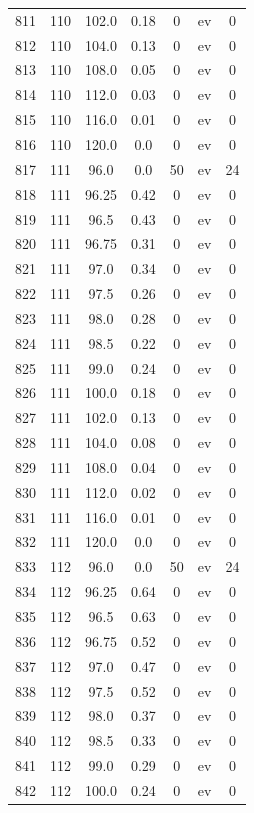 \documentclass[12pt,a4paper]{article}
\begin{document}
\begin{tabular}{r|cccccc}
	811 & 110 & 102.0 & 0.18 & 0 & ev & 0 \\
	812 & 110 & 104.0 & 0.13 & 0 & ev & 0 \\
	813 & 110 & 108.0 & 0.05 & 0 & ev & 0 \\
	814 & 110 & 112.0 & 0.03 & 0 & ev & 0 \\
	815 & 110 & 116.0 & 0.01 & 0 & ev & 0 \\
	816 & 110 & 120.0 & 0.0 & 0 & ev & 0 \\
	817 & 111 & 96.0 & 0.0 & 50 & ev & 24 \\
	818 & 111 & 96.25 & 0.42 & 0 & ev & 0 \\
	819 & 111 & 96.5 & 0.43 & 0 & ev & 0 \\
	820 & 111 & 96.75 & 0.31 & 0 & ev & 0 \\
	821 & 111 & 97.0 & 0.34 & 0 & ev & 0 \\
	822 & 111 & 97.5 & 0.26 & 0 & ev & 0 \\
	823 & 111 & 98.0 & 0.28 & 0 & ev & 0 \\
	824 & 111 & 98.5 & 0.22 & 0 & ev & 0 \\
	825 & 111 & 99.0 & 0.24 & 0 & ev & 0 \\
	826 & 111 & 100.0 & 0.18 & 0 & ev & 0 \\
	827 & 111 & 102.0 & 0.13 & 0 & ev & 0 \\
	828 & 111 & 104.0 & 0.08 & 0 & ev & 0 \\
	829 & 111 & 108.0 & 0.04 & 0 & ev & 0 \\
	830 & 111 & 112.0 & 0.02 & 0 & ev & 0 \\
	831 & 111 & 116.0 & 0.01 & 0 & ev & 0 \\
	832 & 111 & 120.0 & 0.0 & 0 & ev & 0 \\
	833 & 112 & 96.0 & 0.0 & 50 & ev & 24 \\
	834 & 112 & 96.25 & 0.64 & 0 & ev & 0 \\
	835 & 112 & 96.5 & 0.63 & 0 & ev & 0 \\
	836 & 112 & 96.75 & 0.52 & 0 & ev & 0 \\
	837 & 112 & 97.0 & 0.47 & 0 & ev & 0 \\
	838 & 112 & 97.5 & 0.52 & 0 & ev & 0 \\
	839 & 112 & 98.0 & 0.37 & 0 & ev & 0 \\
	840 & 112 & 98.5 & 0.33 & 0 & ev & 0 \\
	841 & 112 & 99.0 & 0.29 & 0 & ev & 0 \\
	842 & 112 & 100.0 & 0.24 & 0 & ev & 0 \\

\end{tabular}
\end{document}
